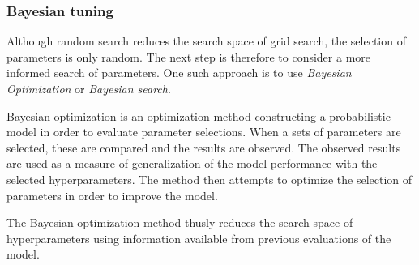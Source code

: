 \subsubsection{Bayesian tuning}

Although random search reduces the search space of grid search, the selection of parameters is only random.
The next step is therefore to consider a more informed search of parameters.
One such approach is to use \textit{Bayesian Optimization} or \textit{Bayesian search}.

Bayesian optimization is an optimization method constructing a probabilistic model in order to evaluate parameter selections.
When a sets of parameters are selected, these are compared and the results are observed.
The observed results are used as a measure of generalization of the model performance with the selected hyperparameters.
The method then attempts to optimize the selection of parameters in order to improve the model.

The Bayesian optimization method thusly reduces the search space of hyperparameters using information available from previous evaluations of the model. 

